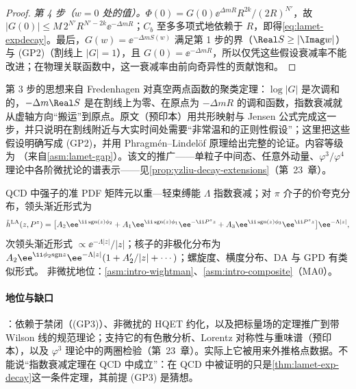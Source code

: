\begin{proof}
\emph{第 4 步（$w=0$ 处的值）。}$\Phi(0)=G(0)\ee^{\Delta mR}R^{2k}/(2R)^{N'}$，故 $|G(0)|\le M\,2^{N'}R^{N'-2k}\ee^{-\Delta mR}$；$C_b$ 至多多项式地依赖于 $R$，即得\cref{eq:lamet-expdecay}。最后，$G(w)=\ee^{-\Delta mS(w)}$ 满足第 1 步的界（$\Real S\ge|\Imag w|$）与 (GP2)（割线上 $|G|=1$），且 $G(0)=\ee^{-\Delta mR}$，所以仅凭这些假设衰减率不能改进；在物理关联函数中，这一衰减率由前向奇异性的贡献饱和\cite{Ji:2026vir}。
\end{proof}

第 3 步的思想来自 Fredenhagen 对真空两点函数的聚类定理\cite{Fredenhagen:1984bz}：$\log|G|$ 是次调和的，$-\Delta m\Real S$ 是在割线上为零、在原点为 $-\Delta mR$ 的调和函数，指数衰减就从虚轴方向“搬运”到原点。原文\cite[第~5.1~节]{Ji:2026vir}（预印本）用共形映射与 Jensen 公式完成这一步，并只说明在割线附近与大实时间处需要“非常温和的正则性假设”；这里把这些假设明确写成 (GP2)，并用 Phragmén--Lindelöf 原理给出完整的论证。内容等级为 \tagC（来自\cref{asm:lamet-gap}）。该文的推广——单粒子中间态、任意外动量、$\varphi^3/\varphi^4$ 理论中各阶微扰论的谱表示——见\cref{prop:yzliu-decay-extensions}（第~23~章）。

\begin{conjecture}\label{conj:lamet-decay-qcd}
QCD 中强子的准 PDF 矩阵元以重—轻束缚能 $\Lambda$ 指数衰减；对 $\pi$ 介子的价夸克分布，领头渐近形式为
\begin{equation}\label{eq:lamet-LA}
\tilde h^{\rm LA}(z,P^z)=\big[A_2\ee^{\ii\,{\rm sgn}(z)\phi_2}+A_1\ee^{\ii\,{\rm sgn}(z)\phi_1}\ee^{-\ii P^zz}+A_3\ee^{\ii\,{\rm sgn}(z)\phi_3}\ee^{\ii P^zz}\big]\ee^{-\Lambda|z|},
\end{equation}%
次领头渐近形式 $\propto\ee^{-\Lambda|z|}/|z|$；核子的非极化分布为 $A_2\ee^{\ii\phi_2{\rm sgn}z}\ee^{-\Lambda|z|}(1+A_2'/|z|+\cdots)$；螺旋度、横度分布、DA 与 GPD 有类似形式。
非微扰地位：\cref{asm:intro-wightman}、\cref{asm:intro-composite}（MA0）。
\end{conjecture}

\paragraph{地位与缺口}
\tagC：依赖于禁闭（(GP3)）、非微扰的 HQET 约化，以及把标量场的定理推广到带 Wilson 线的规范理论；支持它的有色散分析、Lorentz 对称性与重味谱\cite[第~2--3~节]{Ji:2026vir}（预印本），以及 $\varphi^3$ 理论中的两圈检验（第~23~章）。实际上它被用来外推格点数据\cite{Gao:2021dbh,Su:2022fiu}。不能说“指数衰减定理在 QCD 中成立”：在 QCD 中被证明的只是\cref{thm:lamet-exp-decay}这一条件定理，其前提 (GP3) 是猜想。

